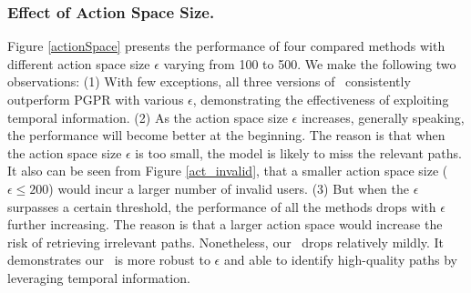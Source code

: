 \subsubsection{\textbf{Effect of Action Space Size.}}
 Figure \ref{actionSpace} presents the performance of four compared methods with different action space size $\epsilon$ varying from 100 to 500. We make the following two observations: 
  (1) With few exceptions, all three versions of \tkgrec\ consistently outperform PGPR with various $\epsilon$, demonstrating the effectiveness of exploiting temporal information. 
(2) As the action space size $\epsilon$ increases, generally speaking, the performance will become better at the beginning.  The reason is that when the action space size $\epsilon$ is too small, the model is likely to miss the relevant paths. It also can be seen from Figure \ref{act_invalid}, that a smaller action space size (\eg\ $ \epsilon\leq 200$) would incur a larger number of invalid users.
 (3) But when the $\epsilon$ surpasses a certain threshold, the performance of all the methods drops with $\epsilon$ further increasing. The reason is that a larger action space would increase the risk of retrieving irrelevant paths. Nonetheless, our \tkgrec\ drops relatively mildly. It demonstrates our \tkgrec\ is more robust to $\epsilon$ and able to identify high-quality paths by leveraging temporal information. 
 
 

